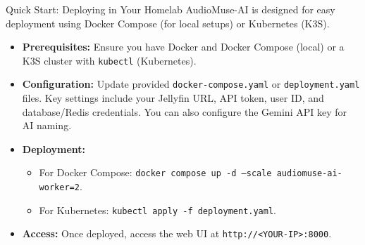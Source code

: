 \documentclass{beamer}
\begin{document}
\begin{frame}{Quick Start: Deploying in Your Homelab}
    AudioMuse-AI is designed for easy deployment using Docker Compose (for local setups) or Kubernetes (K3S).

    \begin{itemize}
        \item \textbf{Prerequisites:} Ensure you have Docker and Docker Compose (local) or a K3S cluster with \texttt{kubectl} (Kubernetes).
        \item \textbf{Configuration:} Update provided \texttt{docker-compose.yaml} or \texttt{deployment.yaml} files. Key settings include your Jellyfin URL, API token, user ID, and database/Redis credentials. You can also configure the Gemini API key for AI naming.
        \item \textbf{Deployment:}
        \begin{itemize}
            \item For Docker Compose: \texttt{docker compose up -d --scale audiomuse-ai-worker=2}.
            \item For Kubernetes: \texttt{kubectl apply -f deployment.yaml}.
        \end{itemize}
        \item \textbf{Access:} Once deployed, access the web UI at \texttt{http://<YOUR-IP>:8000}.
    \end{itemize}
\end{frame}
\end{document}
